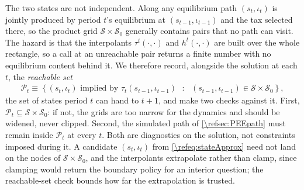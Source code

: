 The two states are not independent. Along any equilibrium path $(s_t,\iota_t)$ is jointly produced by period $t$'s equilibrium at $(s_{t-1},\iota_{t-1})$ and the tax selected there, so the product grid $\mathcal{S}\times\mathcal{S}_0$ generally contains pairs that no path can visit. The hazard is that the interpolants $\tau^t(\cdot,\cdot)$ and $h^t(\cdot,\cdot)$ are built over the whole rectangle, so a call at an unreachable pair returns a finite number with no equilibrium content behind it. We therefore record, alongside the solution at each $t$, the \emph{reachable set}
\begin{align}\label{\refeq:reachable}
    \mathcal{P}_t \equiv \left\lbrace\left(s_t,\iota_t\right)\text{ implied by } \tau_t\left(s_{t-1},\iota_{t-1}\right) \mbox{ }:\mbox{ } \left(s_{t-1},\iota_{t-1}\right)\in\mathcal{S}\times\mathcal{S}_0\right\rbrace,
\end{align}
the set of states period $t$ can hand to $t+1$, and make two checks against it. First, $\mathcal{P}_t\subseteq\mathcal{S}\times\mathcal{S}_0$: if not, the grids are too narrow for the dynamics and should be widened, never clipped. Second, the simulated path of \cref{\refsec:PEEpath} must remain inside $\mathcal{P}_t$ at every $t$. Both are diagnostics on the solution, not constraints imposed during it. A candidate $(s_t,\iota_t)$ from \eqref{\refeq:stateApprox} need not land on the nodes of $\mathcal{S}\times\mathcal{S}_0$, and the interpolants extrapolate rather than clamp, since clamping would return the boundary policy for an interior question; the reachable-set check bounds how far the extrapolation is trusted.

